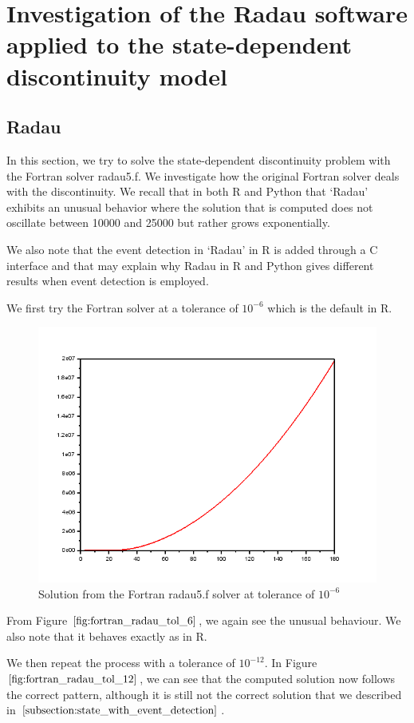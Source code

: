 
\section{Investigation of the Radau software applied to the state-dependent discontinuity model}
\label{section:fortran_inaccuracies}
\subsection{Radau}
In this section, we try to solve the state-dependent discontinuity problem with the Fortran solver radau5.f. We investigate how the original Fortran solver deals with the discontinuity. We recall that in both R and Python that `Radau' exhibits an unusual behavior where the solution that is computed does not oscillate between 10000 and 25000 but rather grows exponentially. 

We also note that the event detection in `Radau' in R is added through a C interface and that may explain why Radau in R and Python gives different results when event detection is employed.

We first try the Fortran solver at a tolerance of $10^{-6}$ which is the default in R.
\begin{figure}[h]
\centering
\includegraphics[width=0.7\linewidth]{./figures/fortran_radau_tol_6}
\caption{Solution from the Fortran radau5.f solver at tolerance of $10^{-6}$}
\label{fig:fortran_radau_tol_6}
\end{figure}

From Figure $\ref{fig:fortran_radau_tol_6}$, we again see the unusual behaviour. We also note that it behaves exactly as in R.

We then repeat the process with a tolerance of $10^{-12}$. In Figure $\ref{fig:fortran_radau_tol_12}$, we can see that the computed solution now follows the correct pattern, although it is still not the correct solution that we described in $\ref{subsection:state_with_event_detection}$.

